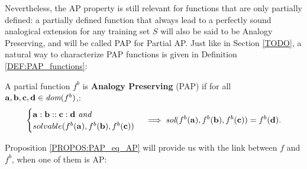 Nevertheless, the AP property is still relevant for functions that are only
partially defined: a partially defined function that always lead to a perfectly
sound analogical extension for any training set $S$ will also be said to be
Analogy Preserving, and will be called PAP for Partial AP. Just like in Section
\ref{TODO}, a natural way to characterize PAP functions is given in Definition
\ref{DEF:PAP_functions}:

\begin{definition}
  \label{DEF:PAP_functions}
  A partial function $f^b$ is {\bf Analogy Preserving} (PAP)
  if for all $\mathbf{a}, \mathbf{b}, \mathbf{c}, \mathbf{d} \in
  \emph{dom}(f^b)$,:
  $$
  \begin{cases}
    \mathbf{a} :  \mathbf{b} ::  \mathbf{c} :  \mathbf{d} \emph{ and }\\
    solvable(f^b(\mathbf{a}),f^b(\mathbf{b}),f^b(\mathbf{c}))
  \end{cases}
  \implies \emph{sol}(f^b(\mathbf{a}),f^b(\mathbf{b}),f^b(\mathbf{c})) =
  f^b(\mathbf{d}).
  $$
\end{definition}

Proposition \ref{PROPOS:PAP_eq_AP} will provide us with the link between $f$
and $f^b$, when one of them is AP:

